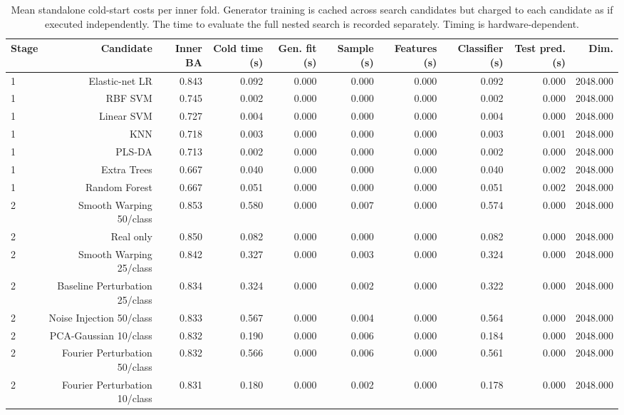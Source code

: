 \begin{table}[t]
\centering
\caption{Mean standalone cold-start costs per inner fold. Generator training is cached across search candidates but charged to each candidate as if executed independently. The time to evaluate the full nested search is recorded separately. Timing is hardware-dependent.}
\label{tab:computational_effort}
\footnotesize
\setlength{\tabcolsep}{4pt}
\begin{tabular}{lrrrrrrrrr}
\toprule
Stage & Candidate & Inner BA & Cold time (s) & Gen. fit (s) & Sample (s) & Features (s) & Classifier (s) & Test pred. (s) & Dim. \\
\midrule
1 & Elastic-net LR & 0.843 & 0.092 & 0.000 & 0.000 & 0.000 & 0.092 & 0.000 & 2048.000 \\
1 & RBF SVM & 0.745 & 0.002 & 0.000 & 0.000 & 0.000 & 0.002 & 0.000 & 2048.000 \\
1 & Linear SVM & 0.727 & 0.004 & 0.000 & 0.000 & 0.000 & 0.004 & 0.000 & 2048.000 \\
1 & KNN & 0.718 & 0.003 & 0.000 & 0.000 & 0.000 & 0.003 & 0.001 & 2048.000 \\
1 & PLS-DA & 0.713 & 0.002 & 0.000 & 0.000 & 0.000 & 0.002 & 0.000 & 2048.000 \\
1 & Extra Trees & 0.667 & 0.040 & 0.000 & 0.000 & 0.000 & 0.040 & 0.002 & 2048.000 \\
1 & Random Forest & 0.667 & 0.051 & 0.000 & 0.000 & 0.000 & 0.051 & 0.002 & 2048.000 \\
2 & Smooth Warping 50/class & 0.853 & 0.580 & 0.000 & 0.007 & 0.000 & 0.574 & 0.000 & 2048.000 \\
2 & Real only & 0.850 & 0.082 & 0.000 & 0.000 & 0.000 & 0.082 & 0.000 & 2048.000 \\
2 & Smooth Warping 25/class & 0.842 & 0.327 & 0.000 & 0.003 & 0.000 & 0.324 & 0.000 & 2048.000 \\
2 & Baseline Perturbation 25/class & 0.834 & 0.324 & 0.000 & 0.002 & 0.000 & 0.322 & 0.000 & 2048.000 \\
2 & Noise Injection 50/class & 0.833 & 0.567 & 0.000 & 0.004 & 0.000 & 0.564 & 0.000 & 2048.000 \\
2 & PCA-Gaussian 10/class & 0.832 & 0.190 & 0.000 & 0.006 & 0.000 & 0.184 & 0.000 & 2048.000 \\
2 & Fourier Perturbation 50/class & 0.832 & 0.566 & 0.000 & 0.006 & 0.000 & 0.561 & 0.000 & 2048.000 \\
2 & Fourier Perturbation 10/class & 0.831 & 0.180 & 0.000 & 0.002 & 0.000 & 0.178 & 0.000 & 2048.000 \\

\end{tabular}
\end{table}
